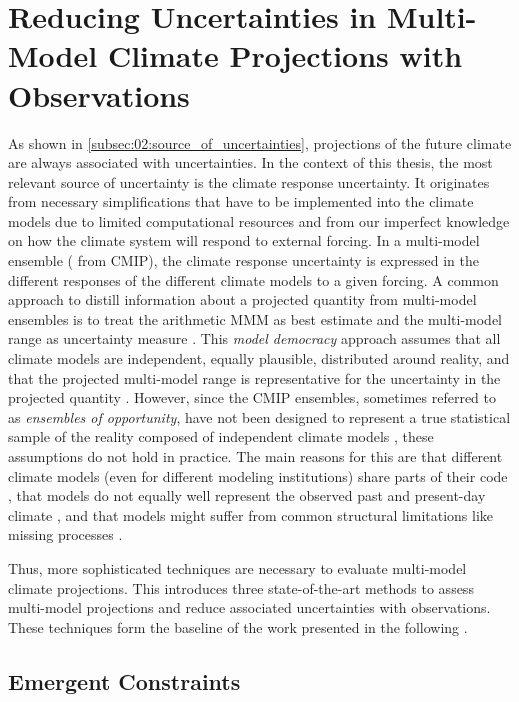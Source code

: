 \section{Reducing Uncertainties in Multi-Model Climate Projections
  with Observations}
\label{sec:02:reducing_uncertainties}

As shown in \cref{subsec:02:source_of_uncertainties}, projections of the future
climate are always associated with uncertainties. In the context of this
thesis, the most relevant source of uncertainty is the climate response
uncertainty. It originates from necessary simplifications that have to be
implemented into the climate models due to limited computational resources and
from our imperfect knowledge on how the climate system will respond to external
forcing. In a multi-model ensemble (\eg{} from \ac{CMIP}), the climate response
uncertainty is expressed in the different responses of the different climate
models to a given forcing. A common approach to distill information about a
projected quantity from multi-model ensembles is to treat the arithmetic
\ac{MMM} as best estimate and the multi-model range as uncertainty measure
\autocite{Collins2013}. This \emph{model democracy} approach assumes that all
climate models are independent, equally plausible, distributed around reality,
and that the projected multi-model range is representative for the uncertainty
in the projected quantity \autocite{Knutti2017a}. However, since the \ac{CMIP}
ensembles, sometimes referred to as \emph{ensembles of opportunity}, have not
been designed to represent a true statistical sample of the reality composed of
independent climate models \autocite{Tebaldi2007}, these assumptions do not
hold in practice. The main reasons for this are that different climate models
(even for different modeling institutions) share parts of their code
\autocite{Abramowitz2019, Knutti2013}, that models do not equally well
represent the observed past and present-day climate \autocite{Gleckler2008,
  Knutti2013}, and that models might suffer from common structural limitations
like missing processes \autocite{Knutti2017a}.

Thus, more sophisticated techniques are necessary to evaluate multi-model
climate projections. This  introduces
three state-of-the-art methods to assess multi-model projections and reduce
associated uncertainties with observations. These techniques form the baseline
of the work presented in the following .


\subsection{Emergent Constraints}
\label{subsec:02:emergent_constraints}


